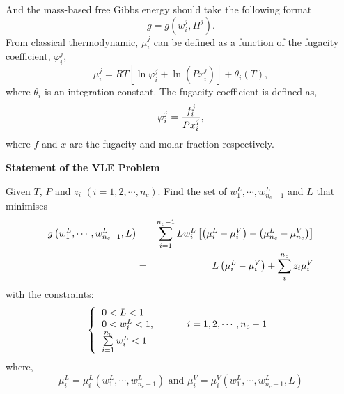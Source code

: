 And the mass-based free Gibbs energy should take the following format
\begin{displaymath}
g = g\left(w_{i}^{j},\Pi^{j}\right).
\end{displaymath}
From classical thermodynamic, $\mu_{i}^{j}$ can be defined as a function of the fugacity coefficient, $\varphi_{i}^{j}$,
\begin{equation}
\mu_{i}^{j}= R T\left[\ln\varphi_{i}^{j} + \ln\left(P x_{i}^{j}\right)\right] + \theta_{i}\left(T\right),
\end{equation}
where $\theta_{i}$ is an integration constant. The fugacity coefficient is defined as,
\begin{equation}
\varphi_{i}^{j} = \displaystyle\frac{f_{i}^{j}}{P x_{i}^{j}},
\end{equation}
where $f$ and $x$ are the fugacity and molar fraction respectively.

\clearpage

\begin{shaded}
   \begin{center}
     {\bf Statement of the VLE Problem}
   \end{center}

   Given $T$, $P$ and $z_{i}$ $\left(i=1,2,\cdots,n_{c}\right)$. Find the set of $w_{1}^{L},\cdots,w_{n_{c}-1}^{L}$ and $L$ that minimises
   \begin{eqnarray}
      g\left(w_{1}^{L},\cdots,w_{n_{c}-1}^{L}, L\right) &=& \sum\limits_{i=1}^{n_{c}-1}Lw_{i}^{L}\left[\left(\mu_{i}^{L}-\mu_{i}^{V}\right)-\left(\mu_{n_{c}}^{L}-\mu_{n_{c}}^{V}\right)\right] \nonumber\\
         &=& L\left(\mu_{i}^{L}-\mu_{i}^{V}\right) + \sum\limits_{i}^{n_{c}}z_{i}\mu_{i}^{V} 
   \end{eqnarray}
   with the constraints:
\[ 
\left\{
  \begin{tabular}{l}
  $0 < L < 1$ \\
  $0 < w_{i}^{L} < 1$, \hspace{1cm} $i=1,2,\cdots,n_{c}-1$\\
  $\summation_{i=1}^{n_{c}}w_{i}^{L} < 1$\\ 
  \end{tabular}
\right.
\]
where,
\begin{displaymath}
   \mu_{i}^{L}=\mu_{i}^{L}\left(w_{1}^{L},\cdots,w_{n_{c}-1}^{L}\right)\text{ and }\mu_{i}^{V}=\mu_{i}^{V}\left(w_{1}^{L},\cdots,w_{n_{c}-1}^{L}, L\right)
\end{displaymath}

\end{shaded}
